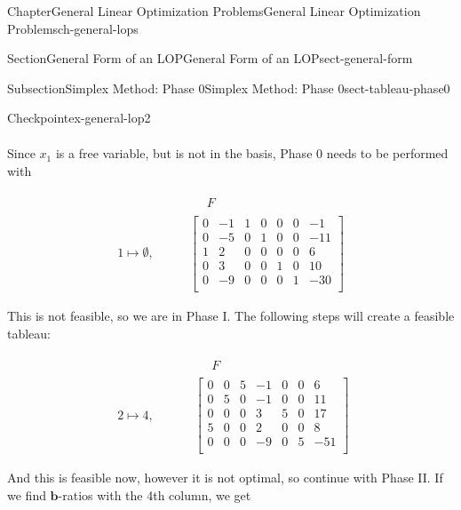 \documentclass[oneside,10pt,]{book}
\numberwithin{equation}{section}
\newcommand{\amp}{&}
\begin{document}
\begin{chapterptx}{Chapter}{General Linear Optimization Problems}{}{General Linear Optimization Problems}{}{}{ch-general-lops}
\begin{sectionptx}{Section}{General Form of an LOP}{}{General Form of an LOP}{}{}{sect-general-form}
\begin{subsectionptx}{Subsection}{Simplex Method: Phase 0}{}{Simplex Method: Phase 0}{}{}{sect-tableau-phase0}
\begin{inlineexercise}{Checkpoint}{}{ex-general-lop2}
\begin{align*}
\end{align*}
%
\par
Since \(x_1\) is a free variable, but is not in the basis, Phase 0 needs to be performed with%
\par
%
\begin{align*}
\amp\begin{array}{rrrrrr}\phantom{11} F \end{array}\\
1 \mapsto \emptyset, \qquad \amp \left[\begin{array}{rr|rrrr|r} 0 \amp -1 \amp 1 \amp 0 \amp 0 \amp 0 \amp -1\\ 0 \amp -5 \amp 0 \amp 1 \amp 0 \amp 0 \amp -11\\ 1 \amp 2 \amp 0 \amp 0 \amp 0 \amp 0 \amp 6\\ 0 \amp 3 \amp 0 \amp 0 \amp 1 \amp 0 \amp 10\\ \hline 0 \amp -9 \amp 0 \amp 0 \amp 0 \amp 1 \amp -30\\ \end{array} \right]
\end{align*}
%
\par
This is not feasible, so we are in Phase I. The following steps will create a feasible tableau:%
\par
%
\begin{align*}
\amp\begin{array}{rrrrrr}\phantom{11} F \end{array}\\
\begin{array}{r} 2 \mapsto 4,  \end{array} \qquad \amp \left[\begin{array}{rr|rrrr|r} 0 \amp 0 \amp 5 \amp -1 \amp 0 \amp 0 \amp 6\\ 0 \amp 5 \amp 0 \amp -1 \amp 0 \amp 0 \amp 11\\ 0 \amp 0 \amp 0 \amp 3 \amp 5 \amp 0 \amp 17\\ 5 \amp 0 \amp 0 \amp 2 \amp 0 \amp 0 \amp 8\\ \hline 0 \amp 0 \amp 0 \amp -9 \amp 0 \amp 5 \amp -51\\ \end{array} \right]
\end{align*}
%
\par
And this is feasible now, however it is not optimal, so continue with Phase II. If we find \(\boldsymbol{b}\)-ratios with the 4th column, we get%
\par
%
\begin{equation*}

\end{equation*}
\end{inlineexercise}
\end{subsectionptx}
\end{sectionptx}
\end{chapterptx}
\end{document}

